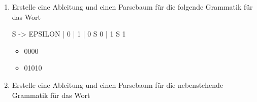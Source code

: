 \documentclass{bschlangaul-aufgabe}
\begin{document}
\begin{enumerate}

%

\item Erstelle eine Ableitung und einen Parsebaum für die folgende
Grammatik für das Wort


\begin{bProduktionsRegeln}
S -> EPSILON | 0 | 1 | 0 S 0 | 1 S 1
\end{bProduktionsRegeln}

\begin{itemize}

%

\item 0000

\begin{bAntwort}

\begin{center}
\end{center}
\end{bAntwort}

%

\item 01010

\begin{bAntwort}

\begin{center}
\end{center}
\end{bAntwort}
\end{itemize}

%

\item Erstelle eine Ableitung und einen Parsebaum für die nebenstehende
Grammatik für das Wort


\end{enumerate}
\end{document}
